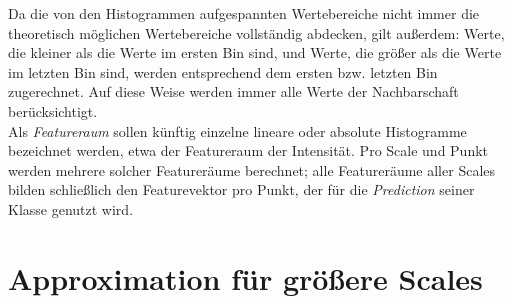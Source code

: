 Da die von den Histogrammen aufgespannten Wertebereiche nicht immer die theoretisch möglichen Wertebereiche vollständig abdecken, gilt außerdem: Werte, die kleiner als die Werte im ersten Bin sind, und Werte, die größer als die Werte im letzten Bin sind, werden entsprechend dem ersten bzw. letzten Bin zugerechnet. Auf diese Weise werden immer alle Werte der Nachbarschaft berücksichtigt. \\
Als \textit{Featureraum} sollen künftig einzelne lineare oder absolute Histogramme bezeichnet werden, etwa der Featureraum der Intensität. Pro Scale und Punkt werden mehrere solcher Featureräume berechnet; alle Featureräume aller Scales bilden schließlich den Featurevektor pro Punkt, der für die \textit{Prediction} seiner Klasse genutzt wird.

\section{Approximation für größere Scales}

